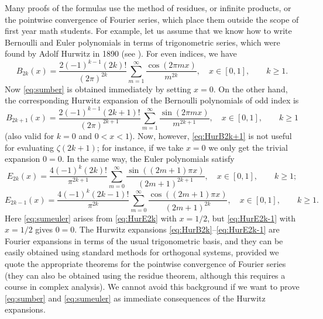 \documentclass[11pt, oneside]{article}
\theoremstyle{plain}
\theoremstyle{definition}
\begin{document}
Many proofs of the formulas use the method of residues, or infinite products, or the pointwise convergence of Fourier series, which place them outside the scope of first year math students.
For example, let us assume that we know how to write Bernoulli and Euler polynomials in terms of trigonometric series, which were found by Adolf Hurwitz in 1890 (see \cite[\S\,24.8(i)]{Dil-NIST}). For even indices, we have
\begin{equation}
\label{eq:HurB2k}
  B_{2k}(x) = \frac{2(-1)^{k-1}(2k)!}{(2\pi)^{2k}} 
  \sum_{m=1}^{\infty} \frac{\cos(2\pi mx)}{m^{2k}},
  \quad
  x \in [0,1],
  \qquad k \geq 1.
\end{equation}
Now \eqref{eq:sumber} is obtained immediately by setting $x=0$. On the other hand, the corresponding Hurwitz expansion of the Bernoulli polynomials of odd index is 
\begin{equation}
\label{eq:HurB2k+1}
  B_{2k+1}(x) = \frac{2(-1)^{k-1}(2k+1)!}{(2\pi)^{2k+1}} 
  \sum_{m=1}^{\infty} \frac{\sin(2\pi mx)}{m^{2k+1}},
  \quad
  x \in [0,1],
  \qquad k \geq 1
\end{equation}
(also valid for $k=0$ and $0<x<1$). Now, however, \eqref{eq:HurB2k+1} is not useful for evaluating $\zeta(2k+1)$; for instance, if we take $x=0$ we only get the trivial expansion $0=0$. In the same way, the Euler polynomials satisfy 
\begin{equation}
\label{eq:HurE2k}
  E_{2k}(x) = \frac{4(-1)^{k}(2k)!}{\pi^{2k+1}} 
  \sum_{m=0}^{\infty} \frac{\sin((2m+1)\pi x)}{(2m+1)^{2k+1}},
  \quad
  x \in [0,1],
  \qquad k \geq 1;
\end{equation}
\begin{equation}
\label{eq:HurE2k-1}
  E_{2k-1}(x) = \frac{4(-1)^{k}(2k-1)!}{\pi^{2k}} 
  \sum_{m=0}^{\infty} \frac{\cos((2m+1)\pi x)}{(2m+1)^{2k}},
  \quad
  x \in [0,1],
  \qquad k \geq 1.
\end{equation}
Here \eqref{eq:sumeuler} arises from \eqref{eq:HurE2k} with $x=1/2$, but \eqref{eq:HurE2k-1} with $x=1/2$ gives $0=0$. The Hurwitz expansions \eqref{eq:HurB2k}--\eqref{eq:HurE2k-1} are Fourier expansions in terms of the usual trigonometric basis, and they can be easily obtained using standard methods for orthogonal systems, provided we quote the appropriate theorems for the pointwise convergence of Fourier series (they can also be obtained using the residue theorem, although this requires a course in complex analysis). We cannot avoid this background if we want to prove \eqref{eq:sumber} and \eqref{eq:sumeuler} as immediate consequences of the Hurwitz expansions. 
\end{document}
